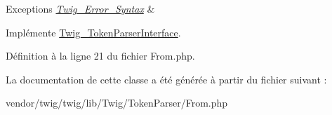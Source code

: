 \begin{DoxyExceptions}{Exceptions}
{\em \hyperlink{class_twig___error___syntax}{Twig\+\_\+\+Error\+\_\+\+Syntax}} & \\
\hline
\end{DoxyExceptions}


Implémente \hyperlink{interface_twig___token_parser_interface_a5dfa2e269321584fb74e8b43dabe0efd}{Twig\+\_\+\+Token\+Parser\+Interface}.



Définition à la ligne 21 du fichier From.\+php.



La documentation de cette classe a été générée à partir du fichier suivant \+:\begin{DoxyCompactItemize}
\item 
vendor/twig/twig/lib/\+Twig/\+Token\+Parser/From.\+php\end{DoxyCompactItemize}
